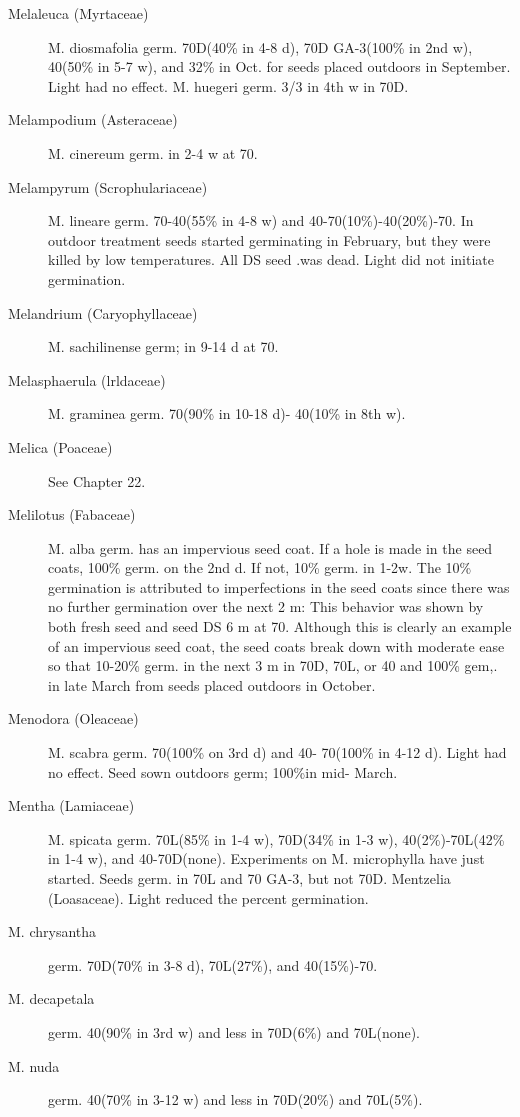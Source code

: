 \begin{description}
\item[Melaleuca (Myrtaceae)]
M. diosmafolia germ. 70D(40\% in 4-8 d), 70D GA-3(100\% in 2nd w), 40(50\% in
5-7 w), and 32\% in Oct. for seeds placed outdoors in September. Light had no effect.
M. huegeri germ. 3/3 in 4th w in 70D.
\item[Melampodium (Asteraceae)] M. cinereum germ. in 2-4 w at 70.
\item[Melampyrum (Scrophulariaceae)] M. lineare germ. 70-40(55\% in 4-8 w)
and 40-70(10\%)-40(20\%)-70. In outdoor treatment seeds started germinating in
February, but they were killed by low temperatures. All DS seed .was dead. Light did
not initiate germination.

\item[Melandrium (Caryophyllaceae)] M. sachilinense germ; in 9-14 d at 70.
\item[Melasphaerula (lrldaceae)] M. graminea germ. 70(90\% in 10-18 d)-
40(10\% in 8th w).
\item[Melica (Poaceae)] See Chapter 22.
\item[Melilotus (Fabaceae)] M. alba germ. has an impervious seed coat. If a hole
is made in the seed coats, 100\% germ. on the 2nd d. If not, 10\% germ. in 1-2w. The
10\% germination is attributed to imperfections in the seed coats since there was no
further germination over the next 2 m: This behavior was shown by both fresh seed
and seed DS 6 m at 70. Although this is clearly an example of an impervious seed
coat, the seed coats break down with moderate ease so that 10-20\% germ. in the next
3 m in 70D, 70L, or 40 and 100\% gem,. in late March from seeds placed outdoors in
October.
\item[Menodora (Oleaceae)] M. scabra germ. 70(100\% on 3rd d) and 40-
70(100\% in 4-12 d). Light had no effect. Seed sown outdoors germ; 100\%in mid-
March.

\item[Mentha (Lamiaceae)] M. spicata germ. 70L(85\% in 1-4 w), 70D(34\% in 1-3
w), 40(2\%)-70L(42\% in 1-4 w), and 40-70D(none). Experiments on M. microphylla
have just started. Seeds germ. in 70L and 70 GA-3, but not 70D.
Mentzelia (Loasaceae). Light reduced the percent germination.
\item[M. chrysantha] germ. 70D(70\% in 3-8 d), 70L(27\%), and 40(15\%)-70.
\item[M. decapetala] germ. 40(90\% in 3rd w) and less in 70D(6\%) and 70L(none).
\item[M. nuda] germ. 40(70\% in 3-12 w) and less in 70D(20\%) and 70L(5\%).


\end{description}
